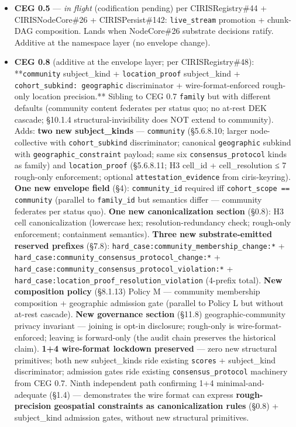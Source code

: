 \documentclass[10pt]{article}
\begin{document}
\begin{itemize}
\item \textbf{CEG 0.5} — \textit{in flight} (codification pending) per CIRISRegistry\#44 + CIRISNodeCore\#26 + CIRISPersist\#142: \texttt{live\_stream} promotion + chunk-DAG composition. Lands when NodeCore\#26 substrate decisions ratify. Additive at the namespace layer (no envelope change).
\item \textbf{CEG 0.8} (additive at the envelope layer; per CIRISRegistry\#48): **\texttt{community} subject\_kind + \texttt{location\_proof} subject\_kind + \texttt{cohort\_subkind: geographic} discriminator + wire-format-enforced rough-only location precision.** Sibling to CEG 0.7 \texttt{family} but with different defaults (community content federates per status quo; no at-rest DEK cascade; §10.1.4 structural-invisibility does NOT extend to community). Adds: \textbf{two new subject\_kinds} — \texttt{community} (§5.6.8.10; larger node-collective with \texttt{cohort\_subkind} discriminator; canonical \texttt{geographic} subkind with \texttt{geographic\_constraint} payload; same six \texttt{consensus\_protocol} kinds as family) and \texttt{location\_proof} (§5.6.8.11; H3 cell\_id + cell\_resolution ≤ 7 rough-only enforcement; optional \texttt{attestation\_evidence} from ciris-keyring). \textbf{One new envelope field} (§4): \texttt{community\_id} required iff \texttt{cohort\_scope == community} (parallel to \texttt{family\_id} but semantics differ — community federates per status quo). \textbf{One new canonicalization section} (§0.8): H3 cell canonicalization (lowercase hex; resolution-redundancy check; rough-only enforcement; containment semantics). \textbf{Three new substrate-emitted reserved prefixes} (§7.8): \texttt{hard\_case:community\_membership\_change:*} + \texttt{hard\_case:community\_consensus\_protocol\_change:*} + \texttt{hard\_case:community\_consensus\_protocol\_violation:*} + \texttt{hard\_case:location\_proof\_resolution\_violation} (4-prefix total). \textbf{New composition policy} (§8.1.13) Policy M — community membership composition + geographic admission gate (parallel to Policy L but without at-rest cascade). \textbf{New governance section} (§11.8) geographic-community privacy invariant — joining is opt-in disclosure; rough-only is wire-format-enforced; leaving is forward-only (the audit chain preserves the historical claim). \textbf{1+4 wire-format lockdown preserved} — zero new structural primitives; both new subject\_kinds ride existing \texttt{scores} + subject\_kind discriminator; admission gates ride existing \texttt{consensus\_protocol} machinery from CEG 0.7. Ninth independent path confirming 1+4 minimal-and-adequate (§1.4) — demonstrates the wire format can express \textbf{rough-precision geospatial constraints as canonicalization rules} (§0.8) + subject\_kind admission gates, without new structural primitives.

\end{itemize}
\end{document}
